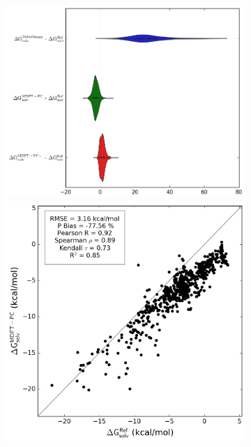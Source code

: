 \begin{figure}[H]
   \begin{subfigure}[b]{0.40\textwidth}
         \includegraphics[width=\textwidth]{chapters/BDD/images/freesolv_1/error_distribution_calc_all.png}
         \par\bigskip
         \includegraphics[width=\textwidth]{chapters/BDD/images/freesolv_1/correlation__mdft_energy_pc__vs__calc.png}

\end{subfigure}
\end{figure}

